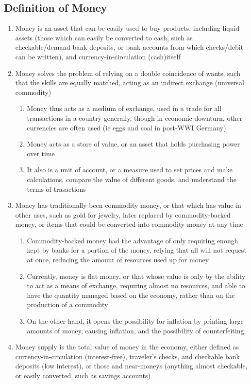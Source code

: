 \documentclass[11 pt, twoside]{article}
\begin{document}
\subsection{Definition of Money}
\begin{enumerate}
\item Money is an asset that can be easily used to buy products, including liquid assets (those which can easily be converted to cash, such as checkable/demand bank deposits, or bank accounts from which checks/debit can be written), and currency-in-circulation (cash)itself
\item Money solves the problem of relying on a double coincidence of wants, such that the skills are equally matched, acting as an indirect exchange (universal commodity)
\begin{enumerate}
\item Money thus acts as a medium of exchange, used in a trade for all transactions in a country generally, though in economic downturn, other currencies are often used (ie eggs and coal in post-WWI Germany)
\item Money acts as a store of value, or an asset that holds purchasing power over time
\item It also is a unit of account, or a measure used to set prices and make calculations, compare the value of different goods, and understand the terms of trasactions
\end{enumerate}
\item Money has traditionally been commodity money, or that which has value in other uses, such as gold for jewelry, later replaced by commodity-backed money, or items that could be converted into commodity money at any time
\begin{enumerate}
\item Commodity-backed money had the advantage of only requiring enough kept by banks for a portion of the money, relying that all will not request at once, reducing the amount of resources used up for money
\item Currently, money is flat money, or that whose value is only by the ability to act as a means of exchange, requiring almost no resources, and able to have the quantity managed based on the economy, rather than on the production of a commodity
\item On the other hand, it opens the possibility for inflation by printing large amounts of money, causing inflation, and the possibility of counterfeiting
\end{enumerate}
\item Money supply is the total value of money in the economy, either defined as currency-in-circulation (interest-free), traveler's checks, and checkable bank deposits (low interest), or those and near-moneys (anything almost checkable, or easily converted, such as savings accounts)

\end{enumerate}
\end{document}

